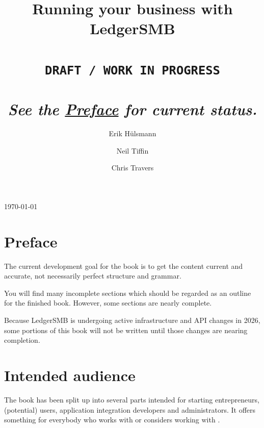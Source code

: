 \else

    \author{Erik H\"ulsmann \and Neil Tiffin \and Chris Travers}
    \title{
        Running your business with
        LedgerSMB \ledgerSMBversion \\
        ~ \\
        \texttt{DRAFT / WORK IN PROGRESS} \\
        ~ \\
        \footnotesize{\emph{See the \hyperref[preface]{Preface}  for current status.}}\\
    }

    \maketitle
    \begin{center}
    \today
    \end{center}

\fi

\tableofcontents

\listoffigures

\listoftables

\cleardoublepage

\section*{Preface}
\label{preface}

The current development goal for the book is to get the content current and accurate,
not necessarily perfect structure and grammar.

You will find many incomplete sections which should be regarded as an outline for the finished book.
However, some sections are nearly complete.

Because LedgerSMB is undergoing active infrastructure and API changes in 2026, some portions of this book will not be written until those changes are nearing completion.

\section*{Intended audience}
\label{sec-intended-audience}

The book has been split up into several parts intended for starting entrepreneurs,
(potential) users, application integration developers and
administrators.
It offers something for everybody who works with or considers working with \lsmb.

